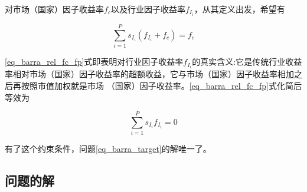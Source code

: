 对市场（国家）因子收益率$f_c$以及行业因子收益率$f_{I_i}$，从其定义出发，希望有

\begin{equation}\label{eq_barra_rel_fc_fp}
    \sum_{i=1}^P s_{I_i}(f_{I_i} + f_c) = f_c
\end{equation}

\ref{eq_barra_rel_fc_fp}式即表明对行业因子收益率$f_{I_i}$的真实含义:它是传统行业收益率相对市场（国家）因子收益率的超额收益，它与市场（国家）因子收益率相加之后再按照市值加权就是市场 （国家）因子收益率。\ref{eq_barra_rel_fc_fp}式化简后等效为

\begin{equation}
    \sum_{i=1}^P s_{I_i} f_{I_i} = 0
\end{equation}

有了这个约束条件，问题\ref{eq_barra_target}的解唯一了。

\subsection{问题的解}


